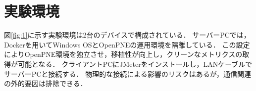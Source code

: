 \documentclass[twoside,twocolumn,10pt]{jarticle}  %
\begin{document}

\section{実験環境}\label{sec:environment}

図\ref{fig:1}に示す実験環境は2台のデバイスで構成されている．
サーバーPCでは，Dockerを用いてWindows OSとOpenPNEの運用環境を隔離している．
この設定によりOpenPNE環境を独立させ，移植性が向上し，クリーンなメトリクスの取得が可能となる．
クライアントPCにJMeterをインストールし，LANケーブルでサーバーPCと接続する．
物理的な接続による影響のリスクはあるが，通信関連の外的要因は排除できる．
\end{document}
